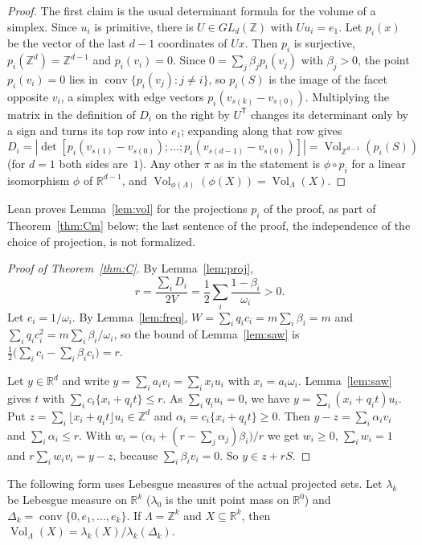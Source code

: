 \documentclass[11pt]{article}
\theoremstyle{definition}
\theoremstyle{remark}
\newcommand{\R}{\mathbb R}
\newcommand{\Z}{\mathbb Z}
\newcommand{\conv}{\operatorname{conv}}
\newcommand{\Vol}{\operatorname{Vol}}
\newcommand{\fr}[1]{\{#1\}}
\begin{document}
\begin{proof}
The first claim is the usual determinant formula for the volume of a simplex.
Since $u_i$ is primitive, there is $U\in GL_d(\Z)$ with $Uu_i=e_1$. Let
$p_i(x)$ be the vector of the last $d-1$ coordinates of $Ux$. Then $p_i$ is
surjective, $p_i(\Z^d)=\Z^{d-1}$ and $p_i(v_i)=0$. Since
$0=\sum_j\beta_jp_i(v_j)$ with $\beta_j>0$, the point $p_i(v_i)=0$ lies in
$\conv\{p_i(v_j):j\ne i\}$, so $p_i(S)$ is the image of the facet opposite
$v_i$, a simplex with edge vectors $p_i(v_{s(k)}-v_{s(0)})$. Multiplying the
matrix in the definition of $D_i$ on the right by $U^{\mathsf T}$ changes its
determinant only by a sign and turns its top row into $e_1$; expanding along
that row gives
$D_i=|\det[p_i(v_{s(1)}-v_{s(0)});\dots;p_i(v_{s(d-1)}-v_{s(0)})]|
=\Vol_{\Z^{d-1}}(p_i(S))$ (for $d=1$ both sides are~$1$). Any other $\pi$ as
in the statement is $\phi\circ p_i$ for a linear isomorphism $\phi$ of
$\R^{d-1}$, and $\Vol_{\phi(\Lambda)}(\phi(X))=\Vol_\Lambda(X)$.
\end{proof}

\noindent Lean proves Lemma~\ref{lem:vol} for the projections $p_i$ of the
proof, as part of Theorem~\ref{thm:Cm} below; the last sentence of the proof,
the independence of the choice of projection, is not formalized.

\begin{proof}[Proof of Theorem~\ref{thm:C}]
By Lemma~\ref{lem:proj},
\[
r=\frac{\sum_iD_i}{2V}=\frac12\sum_i\frac{1-\beta_i}{\omega_i}>0 .
\]
Let $c_i=1/\omega_i$. By Lemma~\ref{lem:freq}, $W=\sum_iq_ic_i=m\sum_i\beta_i=m$
and $\sum_iq_ic_i^2=m\sum_i\beta_i/\omega_i$, so the bound of
Lemma~\ref{lem:saw} is
$\frac12\bigl(\sum_ic_i-\sum_i\beta_ic_i\bigr)=r$.

Let $y\in\R^d$ and write $y=\sum_ia_iv_i=\sum_ix_iu_i$ with
$x_i=a_i\omega_i$. Lemma~\ref{lem:saw} gives $t$ with
$\sum_ic_i\fr{x_i+q_it}\le r$. As $\sum_iq_iu_i=0$, we have
$y=\sum_i(x_i+q_it)u_i$. Put $z=\sum_i\lfloor x_i+q_it\rfloor u_i\in\Z^d$
and $\alpha_i=c_i\fr{x_i+q_it}\ge0$. Then $y-z=\sum_i\alpha_iv_i$ and
$\sum_i\alpha_i\le r$. With $w_i=\bigl(\alpha_i+(r-\sum_j\alpha_j)\beta_i\bigr)/r$
we get $w_i\ge0$, $\sum_iw_i=1$ and $r\sum_iw_iv_i=y-z$, because
$\sum_i\beta_iv_i=0$. So $y\in z+rS$.
\end{proof}

The following form uses Lebesgue measures of the actual projected sets. Let
$\lambda_k$ be Lebesgue measure on $\R^k$ ($\lambda_0$ is the unit point mass
on $\R^0$) and $\Delta_k=\conv\{0,e_1,\dots,e_k\}$. If $\Lambda=\Z^k$ and
$X\subseteq\R^k$, then $\Vol_\Lambda(X)=\lambda_k(X)/\lambda_k(\Delta_k)$.
\end{document}
